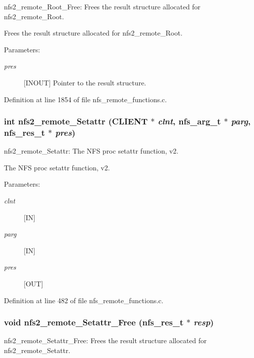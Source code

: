 nfs2\_\-remote\_\-Root\_\-Free: Frees the result structure allocated for nfs2\_\-remote\_\-Root.

Frees the result structure allocated for nfs2\_\-remote\_\-Root.

\begin{Desc}
\item[Parameters:]
\begin{description}
\item[{\em pres}][INOUT] Pointer to the result structure. \end{description}
\end{Desc}


Definition at line 1854 of file nfs\_\-remote\_\-functions.c.
\subsubsection{\setlength{\rightskip}{0pt plus 5cm}int nfs2\_\-remote\_\-Setattr (CLIENT $\ast$ {\em clnt}, nfs\_\-arg\_\-t $\ast$ {\em parg}, nfs\_\-res\_\-t $\ast$ {\em pres})}\label{group__NFSprocs_ga2}


nfs2\_\-remote\_\-Setattr: The NFS proc setattr function, v2.

The NFS proc setattr function, v2.

\begin{Desc}
\item[Parameters:]
\begin{description}
\item[{\em clnt}][IN] \item[{\em parg}][IN] \item[{\em pres}][OUT] \end{description}
\end{Desc}


Definition at line 482 of file nfs\_\-remote\_\-functions.c.
\subsubsection{\setlength{\rightskip}{0pt plus 5cm}void nfs2\_\-remote\_\-Setattr\_\-Free (nfs\_\-res\_\-t $\ast$ {\em resp})}\label{group__NFSprocs_ga56}


nfs2\_\-remote\_\-Setattr\_\-Free: Frees the result structure allocated for nfs2\_\-remote\_\-Setattr.

